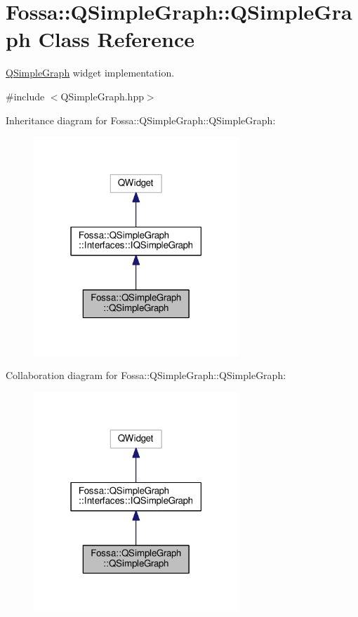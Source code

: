 \hypertarget{class_fossa_1_1_q_simple_graph_1_1_q_simple_graph}{}\section{Fossa\+:\+:Q\+Simple\+Graph\+:\+:Q\+Simple\+Graph Class Reference}
\label{class_fossa_1_1_q_simple_graph_1_1_q_simple_graph}


\hyperlink{class_fossa_1_1_q_simple_graph_1_1_q_simple_graph}{Q\+Simple\+Graph} widget implementation.  




{\ttfamily \#include $<$Q\+Simple\+Graph.\+hpp$>$}



Inheritance diagram for Fossa\+:\+:Q\+Simple\+Graph\+:\+:Q\+Simple\+Graph\+:\nopagebreak
\begin{figure}[H]
\begin{center}
\leavevmode
\includegraphics[width=219pt]{class_fossa_1_1_q_simple_graph_1_1_q_simple_graph__inherit__graph}
\end{center}
\end{figure}


Collaboration diagram for Fossa\+:\+:Q\+Simple\+Graph\+:\+:Q\+Simple\+Graph\+:\nopagebreak
\begin{figure}[H]
\begin{center}
\leavevmode
\includegraphics[width=219pt]{class_fossa_1_1_q_simple_graph_1_1_q_simple_graph__coll__graph}
\end{center}
\end{figure}
